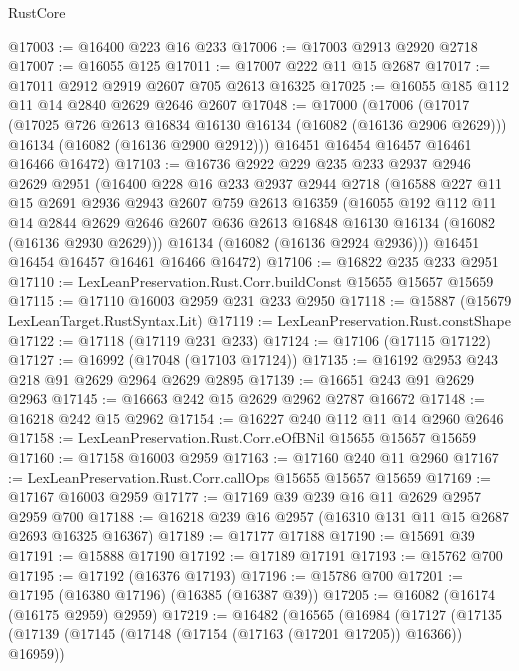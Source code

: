 \begin{lexlean}{RustCore}
\begin{coremodule}
@17003 := @16400 @223 @16 @233
@17006 := @17003 @2913 @2920 @2718
@17007 := @16055 @125
@17011 := @17007 @222 @11 @15 @2687
@17017 := @17011 @2912 @2919 @2607 @705 @2613 @16325
@17025 := @16055 @185 @112 @11 @14 @2840 @2629 @2646 @2607
@17048 := @17000
    (@17006
      (@17017
        (@17025 @726 @2613 @16834 @16130 @16134 (@16082 (@16136 @2906 @2629)))
        @16134
        (@16082 (@16136 @2900 @2912)))
      @16451
      @16454
      @16457
      @16461
      @16466
      @16472)
@17103 := @16736
    @2922
    @229
    @235
    @233
    @2937
    @2946
    @2629
    @2951
    (@16400
      @228
      @16
      @233
      @2937
      @2944
      @2718
      (@16588
        @227
        @11
        @15
        @2691
        @2936
        @2943
        @2607
        @759
        @2613
        @16359
        (@16055
          @192
          @112
          @11
          @14
          @2844
          @2629
          @2646
          @2607
          @636
          @2613
          @16848
          @16130
          @16134
          (@16082 (@16136 @2930 @2629)))
        @16134
        (@16082 (@16136 @2924 @2936)))
      @16451
      @16454
      @16457
      @16461
      @16466
      @16472)
@17106 := @16822 @235 @233 @2951
@17110 := LexLeanPreservation.Rust.Corr.buildConst @15655 @15657 @15659
@17115 := @17110 @16003 @2959 @231 @233 @2950
@17118 := @15887 (@15679 LexLeanTarget.RustSyntax.Lit)
@17119 := LexLeanPreservation.Rust.constShape
@17122 := @17118 (@17119 @231 @233)
@17124 := @17106 (@17115 @17122)
@17127 := @16992 (@17048 (@17103 @17124))
@17135 := @16192 @2953 @243 @218 @91 @2629 @2964 @2629 @2895
@17139 := @16651 @243 @91 @2629 @2963
@17145 := @16663 @242 @15 @2629 @2962 @2787 @16672
@17148 := @16218 @242 @15 @2962
@17154 := @16227 @240 @112 @11 @14 @2960 @2646
@17158 := LexLeanPreservation.Rust.Corr.eOfBNil @15655 @15657 @15659
@17160 := @17158 @16003 @2959
@17163 := @17160 @240 @11 @2960
@17167 := LexLeanPreservation.Rust.Corr.callOps @15655 @15657 @15659
@17169 := @17167 @16003 @2959
@17177 := @17169 @39 @239 @16 @11 @2629 @2957 @2959 @700
@17188 := @16218 @239 @16 @2957 (@16310 @131 @11 @15 @2687 @2693 @16325 @16367)
@17189 := @17177 @17188
@17190 := @15691 @39
@17191 := @15888 @17190
@17192 := @17189 @17191
@17193 := @15762 @700
@17195 := @17192 (@16376 @17193)
@17196 := @15786 @700
@17201 := @17195 (@16380 @17196) (@16385 (@16387 @39))
@17205 := @16082 (@16174 (@16175 @2959) @2959)
@17219 := @16482
    (@16565
      (@16984
        (@17127
          (@17135
            (@17139 (@17145 (@17148 (@17154 (@17163 (@17201 @17205)) @16366)) @16959))

\end{coremodule}
\end{lexlean}

